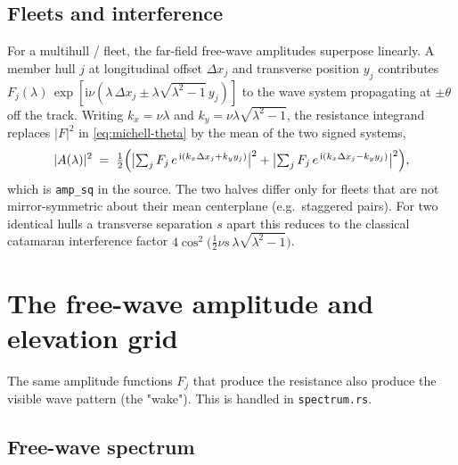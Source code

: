 \documentclass[11pt]{article}
\newcommand{\ii}{\mathrm{i}}
\begin{document}
\subsection{Fleets and interference}
\label{sec:multihull}

For a multihull / fleet, the far-field free-wave amplitudes superpose linearly.
A member hull $j$ at longitudinal offset $\Delta x_j$ and transverse position
$y_j$ contributes
$F_j(\lambda)\,\exp[\ii\nu(\lambda\,\Delta x_j \pm \lambda\sqrt{\lambda^2-1}\,y_j)]$
to the wave system propagating at $\pm\theta$ off the track. Writing
$k_x = \nu\lambda$ and $k_y = \nu\lambda\sqrt{\lambda^2-1}$, the resistance
integrand replaces $|F|^2$ in \eqref{eq:michell-theta} by the mean of the two
signed systems,
\begin{equation}
  |A(\lambda)|^{2} \;=\;
    \tfrac12\Bigl(
      \bigl|\textstyle\sum_j F_j\, e^{\,\ii(k_x\Delta x_j + k_y y_j)}\bigr|^{2}
    + \bigl|\textstyle\sum_j F_j\, e^{\,\ii(k_x\Delta x_j - k_y y_j)}\bigr|^{2}
    \Bigr),
  \label{eq:multi}
\end{equation}
which is \texttt{amp\_sq} in the source. The two halves differ only for fleets
that are not mirror-symmetric about their mean centerplane (e.g.\ staggered
pairs). For two identical hulls a transverse separation $s$ apart this reduces to
the classical catamaran interference factor
$4\cos^{2}\!\bigl(\tfrac12\nu s\,\lambda\sqrt{\lambda^2-1}\bigr)$.

\section{The free-wave amplitude and elevation grid}
\label{sec:spectrum}

The same amplitude functions $F_j$ that produce the resistance also produce the
visible wave pattern (the "wake"). This is handled in \texttt{spectrum.rs}.

\subsection{Free-wave spectrum}
\end{document}
